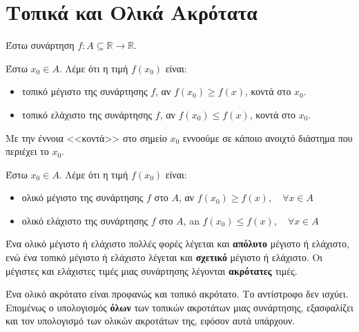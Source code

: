 


\everymath{\displaystyle}
\pagestyle{vangelis}




\chapter*{Τοπικά και Ολικά Ακρότατα}

Έστω συνάρτηση $ f \colon A \subseteq \mathbb{R} \to \mathbb{R} $.

\begin{dfn}
  Έστω $ x_{0} \in A $.  Λέμε ότι η τιμή $ f(x_{0}) $ είναι:
  \begin{itemize}
    \item \textcolor{Col1}{τοπικό μέγιστο}\phantom{a} της συνάρτησης $f$, αν 
      $ f(x_{0}) \geq f(x) $, κοντά στο $ x_{0} $.
    \item \textcolor{Col1}{τοπικό ελάχιστο} της συνάρτησης $f$, αν 
      $ f(x_{0}) \leq f(x) $, κοντά στο $ x_{0} $.  
  \end{itemize}
\end{dfn}

Με την έννοια <<κοντά>> στο σημείο $ x_{0} $ εννοούμε σε κάποιο ανοιχτό διάστημα που 
περιέχει το $ x_{0} $.

\begin{dfn}
  Έστω $ x_{0} \in A $.  Λέμε ότι η τιμή $ f(x_{0}) $ είναι:
  \begin{itemize}
    \item \textcolor{Col1}{ολικό μέγιστο}\phantom{a} της συνάρτησης $f$ στο $ A $, αν 
      $ f(x_{0}) \geq f(x),\quad \forall x \in A $
    \item \textcolor{Col1}{ολικό ελάχιστο} της συνάρτησης $f$ στο $ A $, an 
      $ f(x_{0}) \leq f(x),\quad \forall x \in A $
  \end{itemize}
\end{dfn}

Ένα ολικό μέγιστο ή ελάχιστο πολλές φορές λέγεται και \textbf{απόλυτο} μέγιστο ή 
ελάχιστο, ενώ ένα τοπικό μέγιστο ή ελάχιστο λέγεται και \textbf{σχετικό} μέγιστο ή 
ελάχιστο.  Οι μέγιστες και ελάχιστες τιμές μιας συνάρτησης λέγονται \textbf{ακρότατες} 
τιμές.

\begin{rem}
  Ένα ολικό ακρότατο είναι προφανώς και τοπικό ακρότατο. Το αντίστροφο δεν ισχύει. 
  Επομένως ο υπολογισμός \textbf{όλων} των τοπικών ακροτάτων μιας συνάρτησης, 
  εξασφαλίζει και τον υπολογισμό των ολικών ακροτάτων της, εφόσον αυτά υπάρχουν.
\end{rem}

